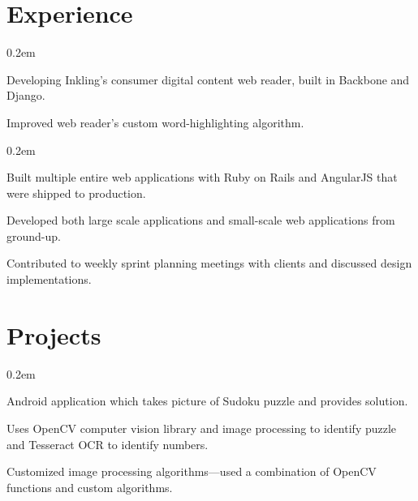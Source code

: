 \documentclass[]{deedy-resume}
\begin{document}
\hfill
\begin{minipage}[t]{0.66\textwidth}


\section{Experience}

\vspace{\topsep}
\begin{tightemize}\itemsep0.2em
\item Developing Inkling's consumer digital content web reader, built in Backbone and Django.
\item Improved web reader's custom word-highlighting algorithm.
\end{tightemize}


\begin{tightemize}\itemsep0.2em
\item Built multiple entire web applications with Ruby on Rails and AngularJS that were shipped to production.
\item Developed both large scale applications and small-scale web applications from ground-up.
\item Contributed to weekly sprint planning meetings with clients and discussed design implementations.
\end{tightemize}

\sectionsep


\section{Projects}
\begin{tightemize}\itemsep0.2em
\item Android application which takes picture of Sudoku puzzle and provides solution.
\item Uses OpenCV computer vision library and image processing to identify puzzle and Tesseract OCR to
identify numbers.
\item Customized image processing algorithms—used a combination of OpenCV functions and custom
  algorithms.
\end{tightemize}
\sectionsep


\end{minipage}
\end{document}
